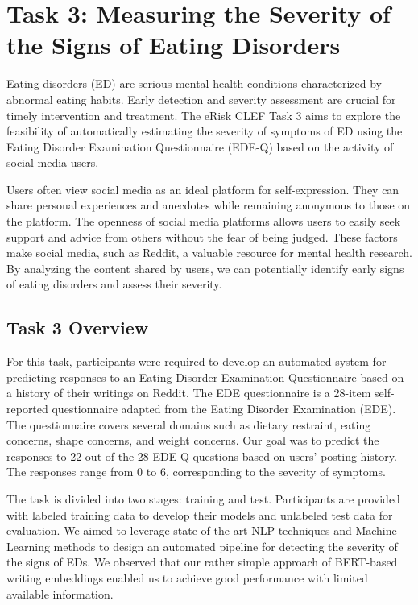 \documentclass[]{style/ceurart}
\begin{document}
\section{Task 3: Measuring the Severity of the Signs of Eating Disorders}

Eating disorders (ED) are serious mental health conditions characterized by abnormal eating habits. Early detection and severity assessment are crucial for timely intervention and treatment. The eRisk CLEF Task 3 aims to explore the feasibility of automatically estimating the severity of symptoms of ED using the Eating Disorder Examination Questionnaire (EDE-Q) based on the activity of social media users.

Users often view social media as an ideal platform for self-expression. They can share personal experiences and anecdotes while remaining anonymous to those on the platform. The openness of social media platforms allows users to easily seek support and advice from others without the fear of being judged. These factors make social media, such as Reddit, a valuable resource for mental health research. By analyzing the content shared by users, we can potentially identify early signs of eating disorders and assess their severity.


\subsection{Task 3 Overview}

For this task, participants were required to develop an automated system for predicting responses to an Eating Disorder Examination Questionnaire based on a history of their writings on Reddit. The EDE questionnaire is a 28-item self-reported questionnaire adapted from the Eating Disorder Examination (EDE). The questionnaire covers several domains such as dietary restraint, eating concerns, shape concerns, and weight concerns. Our goal was to predict the responses to 22 out of the 28 EDE-Q questions based on users' posting history. The responses range from 0 to 6, corresponding to the severity of symptoms.

The task is divided into two stages: training and test. Participants are provided with labeled training data to develop their models and unlabeled test data for evaluation. We aimed to leverage state-of-the-art NLP techniques and Machine Learning methods to design an automated pipeline for detecting the severity of the signs of EDs. We observed that our rather simple approach of BERT-based writing embeddings enabled us to achieve good performance with limited available information.
\end{document}
